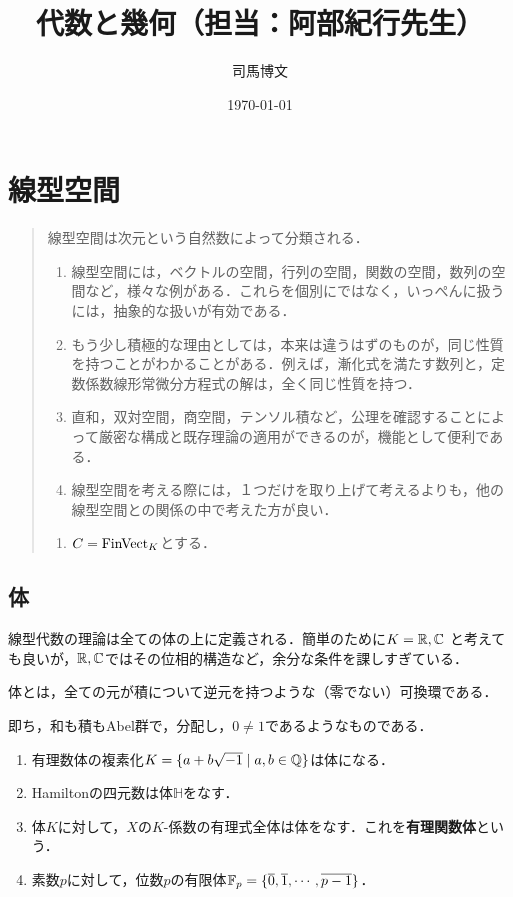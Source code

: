 \documentclass[uplatex, 12pt, dvipdfmx]{jsreport}
\title{代数と幾何（担当：阿部紀行先生）}
\author{司馬博文}
\date{\today}
\begin{document}
\tableofcontents

\chapter{線型空間}

\begin{quotation}
    線型空間は次元という自然数によって分類される．
    \begin{enumerate}
        \item 線型空間には，ベクトルの空間，行列の空間，関数の空間，数列の空間など，様々な例がある．これらを個別にではなく，いっぺんに扱うには，抽象的な扱いが有効である．
        \item もう少し積極的な理由としては，本来は違うはずのものが，同じ性質を持つことがわかることがある．例えば，漸化式を満たす数列と，定数係数線形常微分方程式の解は，全く同じ性質を持つ．
        \item 直和，双対空間，商空間，テンソル積など，公理を確認することによって厳密な構成と既存理論の適用ができるのが，機能として便利である．
        \item 線型空間を考える際には，１つだけを取り上げて考えるよりも，他の線型空間との関係の中で考えた方が良い．
    \end{enumerate}
    \begin{notation}\mbox{}
        \begin{enumerate}
            \item $C=\mathrm{FinVect}_K$とする．
        \end{enumerate}
    \end{notation}
\end{quotation}

\section{体}

\begin{screen}
    線型代数の理論は全ての体の上に定義される．簡単のために$K=\mathbb{R},\mathbb{C}$
    と考えても良いが，$\mathbb{R},\mathbb{C}$ではその位相的構造など，余分な条件を課しすぎている．
\end{screen}

\begin{definition}
    体とは，全ての元が積について逆元を持つような（零でない）可換環である．

    即ち，和も積もAbel群で，分配し，$0\ne 1$であるようなものである．
\end{definition}
\begin{example}\mbox{}
    \begin{enumerate}
        \item 有理数体の複素化$K=\{a+b\sqrt{-1}\mid a,b\in\mathbb{Q}\}$は体になる．
        \item Hamiltonの四元数は体$\mathbb{H}$をなす．
        \item 体$K$に対して，$X$の$K$-係数の有理式全体は体をなす．これを\textbf{有理関数体}という．
        \item 素数$p$に対して，位数$p$の有限体$\mathbb{F}_p=\{\overline{0},\overline{1},\cdots,\overline{p-1}\}$．
    \end{enumerate}
\end{example}
\end{document}
